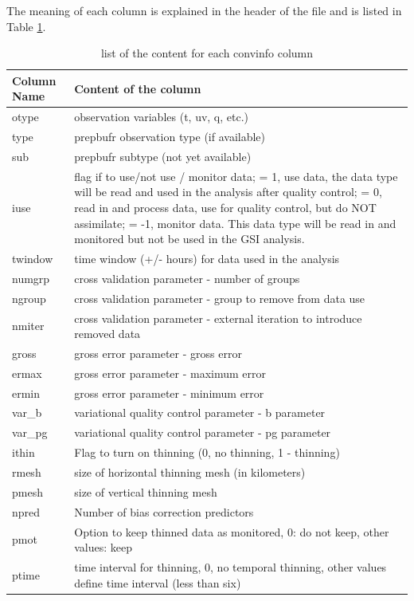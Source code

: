 \begin{enumerate}[leftmargin=*]
\begin{itemize}[leftmargin=*]
The meaning of each column is explained in the header of the file and is listed in Table \ref{tab43}. \\

\begin{table}[htbp]
\centering
\caption{list of the content for each convinfo column}
\begin{tabular}{|p{2cm}|p{14cm}|}
\hline
\hline
Column Name & Content of the column \\
\hline
otype & observation variables (t, uv, q, etc.) \\
\hline
type & prepbufr observation type (if available) \\
\hline
sub	& prepbufr subtype (not yet available) \\
\hline
iuse & flag if to use/not use / monitor data; \newline
= 1, use data, the data type will be read and used in the analysis after quality control;\newline
= 0, read in and process data, use for quality control, but do NOT assimilate;\newline
= -1, monitor data. This data type will be read in and monitored but not be used in the GSI analysis. \\
\hline
twindow	& time window (+/- hours) for data used in the analysis \\
\hline
numgrp & cross validation parameter - number of groups \\
\hline
ngroup & cross validation parameter - group to remove from data use \\
\hline
nmiter & cross validation parameter - external iteration to introduce removed data \\
\hline
gross & gross error parameter - gross error \\
\hline
ermax & gross error parameter - maximum error \\
\hline
ermin & gross error parameter - minimum error \\
\hline
var\_b & variational quality control parameter - b parameter \\
\hline
var\_pg & variational quality control parameter - pg parameter\\
\hline
ithin & Flag to turn on thinning (0, no thinning, 1 - thinning) \\
\hline
rmesh & size of horizontal thinning mesh (in kilometers) \\
\hline
pmesh & size of vertical thinning mesh \\
\hline
npred & Number of bias correction predictors \\
\hline
pmot & Option to keep thinned data as monitored, 0: do not keep, other values: keep \\
\hline
ptime & time interval for thinning, 0, no temporal thinning, other values define time interval (less than six) \\
\hline
\end{tabular}
\label{tab43}
\end{table} 


\end{itemize}
\end{enumerate}
